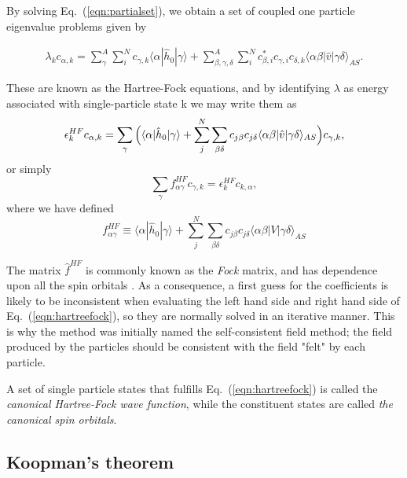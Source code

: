 By solving Eq.~(\ref{eqn:partialset}), we obtain a set of coupled one particle eigenvalue problems given by

\begin{multline}
\lambda _k c_{\alpha,k} =  
\sum _{\gamma}^A\sum _{i}^N c_{\gamma,k}\langle \alpha |\hat{h}_0| \gamma \rangle + 
\sum _{\beta,\gamma,\delta}^A \sum _i^N c_{\beta,i}^{*}c_{\gamma,i}c_{\delta,k}\langle \alpha \beta | \hat{v} |\gamma \delta \rangle_{AS}.
 \label{eqn:HF1}
\end{multline}

These are known as the Hartree-Fock equations, and by identifying $\lambda$ as energy associated with single-particle state k \cite{hh4480} we may write them as
\begin{equation}
\epsilon_k^{HF} c_{\alpha,k} =  
\sum_{\gamma} \Big{(}  {\langle \alpha |\hat{h}_0 | \gamma \rangle + 
\sum_j^N \sum_{\beta \delta}{c_{j \beta} c_{j \delta}  \langle \alpha \beta | \hat{v} | \gamma \delta \rangle_{AS} } } \Big{)} c_{ \gamma, k},
 \label{eqn:HF2}
\end{equation}
or simply 
\begin{equation}
\sum_\gamma f_{\alpha \gamma}^{HF} c_{\gamma,k} = \epsilon_k^{HF} c_{k,\alpha},
\label{eqn:hartreefock}
\end{equation}
where we have defined
\begin{equation}
 f_{\alpha \gamma}^{HF}  \equiv   \langle \alpha |\hat{h}_0 | \gamma \rangle + 
\sum_j^N \sum_{\beta \delta}{c_{j \beta} c_{j \delta}  \langle \alpha \beta | V | \gamma \delta \rangle_{AS} } 
 \label{eqn:HF2}
\end{equation}

The matrix $ \hat{f}^{HF} $ is commonly known as the \emph{Fock}
matrix, and has dependence upon all the spin
orbitals \cite{ShavittBartlett2009}. As a consequence, a first guess
for the coefficients is likely to be inconsistent when evaluating the
left hand side and right hand side of Eq.~(\ref{eqn:hartreefock}), so they
are normally solved in an iterative manner. This is why the method was
initially named the self-consistent field method; the field produced
by the particles should be consistent with the field "felt" by each
particle.

A set of single particle states that fulfills Eq.~(\ref{eqn:hartreefock})
is called the \emph{canonical Hartree-Fock wave function}, while the
constituent states are called \emph{the canonical spin orbitals}.

\subsection{Koopman's theorem}

